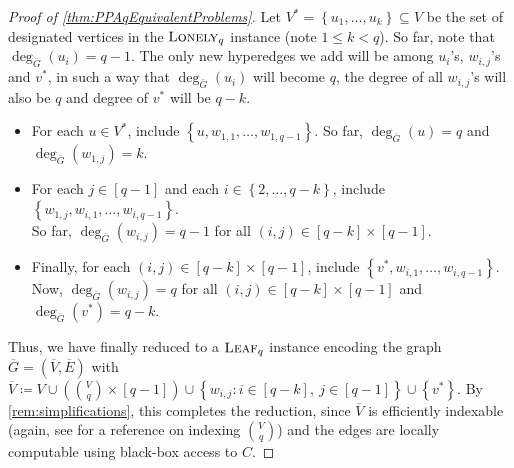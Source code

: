 \documentclass[10pt,a4paper]{article}
\theoremstyle{definition}
\theoremstyle{remark}
\newcommand{\inparen}[1]{\left ( #1 \right )}
\def\set#1{\left\{#1\right\}}
\newcommand{\leaf}{\ensuremath\textsc{Leaf}}
\newcommand{\lonely}{\ensuremath\textsc{Lonely}}
\begin{document}
\begin{proof}[Proof of \autoref{thm:PPAqEquivalentProblems}]
Let $V^* = \set{u_1, \ldots, u_k} \subseteq V$ be the set of designated vertices in the $\lonely_q$ instance (note $1 \le k < q$). So far, note that $\deg_{\overline{G}}(u_i) = q-1$. The only new hyperedges we add will be among $u_i$'s, $w_{i,j}$'s and $v^*$, in such a way that $\deg_{\overline{G}}(u_i)$ will become $q$, the degree of all $w_{i,j}$'s will also be $q$ and degree of $v^*$ will be $q-k$.
\begin{itemize}[label=$\triangleright$, itemsep=3pt]
\item For each $u \in V^*$, include $\set{u, w_{1,1}, \ldots, w_{1,q-1}}$. So far, $\deg_{\overline{G}}(u) = q$ and $\deg_{\overline{G}}(w_{1,j}) = k$.
\item For each $j \in [q-1]$ and each $i \in \set{2, \ldots, q-k}$, include $\set{w_{1,j}, w_{i,1}, \ldots, w_{i,q-1}}$.\\
So far, $\deg_{\overline{G}}(w_{i,j}) = q-1$ for all $(i,j) \in [q-k] \times [q-1]$.
\item Finally, for each $(i,j) \in [q-k] \times [q-1]$, include $\set{v^*, w_{i,1}, \ldots, w_{i,q-1}}$.\\
Now, $\deg_{\overline{G}}(w_{i,j}) = q$ for all $(i,j) \in [q-k] \times [q-1]$ and $\deg_{\overline{G}}(v^*) = q-k$.
\end{itemize}

Thus, we have finally reduced to a $\leaf_q$ instance encoding the graph $\overline{G} = (\overline{V}, \overline{E})$ with $\overline{V} \coloneqq V \cup  \inparen{\binom{V}{q} \times [q-1]} \cup \set{w_{i,j} : i \in [q-k],\ j \in [q-1]} \cup \set{v^*}$. By \autoref{rem:simplifications}, this completes the reduction, since $\overline{V}$ is efficiently indexable (again, see \cite{r31} for a reference on indexing $\binom{V}{q}$) and the edges are locally computable using black-box access to $C$.
\end{proof}
\end{document}

